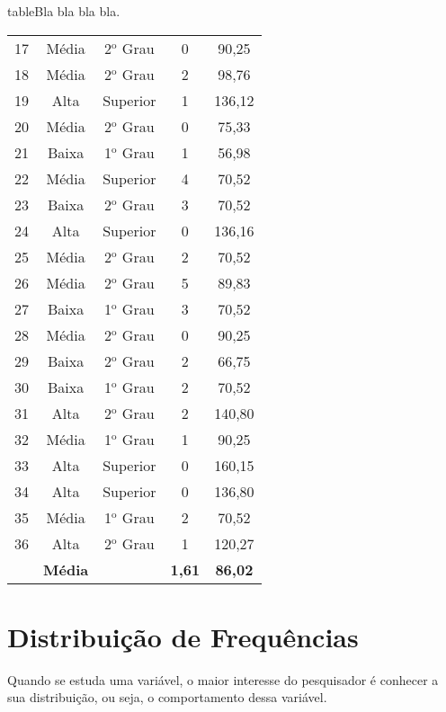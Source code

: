 \documentclass[11pt,fleqn]{book}
\numberwithin{mpicture}{chapter}
\numberwithin{mtable}{chapter}
\numberwithin{mframe}{chapter}
\begin{document}
\begin{pageWidthArea}
\begin{pageWidthAreaPicture}{table}{Bla bla bla bla.}
{\begin{tabular}{ccccc}
			17 & Média & 2$^{\text{o}}$ Grau & 0 & 90,25 \\
			18 & Média & 2$^{\text{o}}$ Grau & 2 & 98,76 \\
			19 & Alta & Superior & 1 & 136,12 \\
			20 & Média & 2$^{\text{o}}$ Grau & 0 & 75,33 \\
			21 & Baixa & 1$^{\text{o}}$ Grau & 1 & 56,98 \\
			22 & Média & Superior & 4 & 70,52 \\
			23 & Baixa & 2$^{\text{o}}$ Grau & 3 & 70,52 \\
			24 & Alta & Superior & 0 & 136,16 \\
			25 & Média & 2$^{\text{o}}$ Grau & 2 & 70,52 \\
			26 & Média & 2$^{\text{o}}$ Grau & 5 & 89,83 \\
			27 & Baixa & 1$^{\text{o}}$ Grau & 3 & 70,52 \\
			28 & Média & 2$^{\text{o}}$ Grau & 0 & 90,25 \\
			29 & Baixa & 2$^{\text{o}}$ Grau & 2 & 66,75 \\
			30 & Baixa & 1$^{\text{o}}$ Grau & 2 & 70,52 \\
			31 & Alta & 2$^{\text{o}}$ Grau & 2 & 140,80 \\
			32 & Média & 1$^{\text{o}}$ Grau & 1 & 90,25 \\
			33 & Alta & Superior & 0 & 160,15 \\
			34 & Alta & Superior & 0 & 136,80 \\
			35 & Média & 1$^{\text{o}}$ Grau & 2 & 70,52 \\
			36 & Alta & 2$^{\text{o}}$ Grau & 1 & 120,27 \\ \midrule
			 & \textbf{Média} &   & \textbf{1,61} & \textbf{86,02} \\ \bottomrule
		\end{tabular}
		}
	\end{pageWidthAreaPicture}
\end{pageWidthArea}


\section{Distribuição de Frequências}

Quando se estuda uma variável, o maior interesse do pesquisador é conhecer a sua distribuição, ou seja, o comportamento dessa variável.
\end{document}
